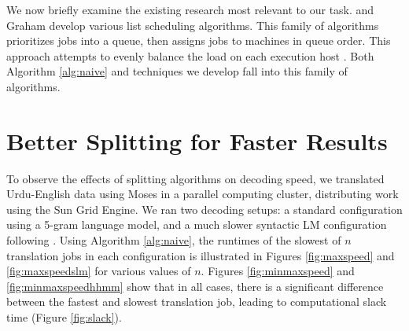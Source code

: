 \documentclass{pbml}
\begin{document}
We now briefly examine the existing research most relevant to our task. \citet{Hu61} and Graham \citeyearpar{Graham66,Graham69} develop various list scheduling algorithms. This family of algorithms prioritizes jobs into a queue, then assigns jobs to machines in queue order. This approach attempts to evenly balance the load on each execution host \citep{DeMorton80,ChengSin90}. 
Both Algorithm \ref{alg:naive} and techniques we develop fall into this family of algorithms.







\section{Better Splitting for Faster Results}


To observe the effects of splitting algorithms on decoding speed, we translated Urdu-English data using Moses in a parallel computing cluster, distributing work using the Sun Grid Engine. We ran two decoding setups: a standard configuration using a 5-gram language model, and a much slower syntactic LM configuration following \citet{schwartzetal11}. Using Algorithm \ref{alg:naive}, the runtimes of the slowest of $n$ translation jobs in each configuration is illustrated in Figures \ref{fig:maxspeed} and \ref{fig:maxspeedslm} for various values of $n$. Figures \ref{fig:minmaxspeed} and \ref{fig:minmaxspeedhhmm} show that in all cases, there is a significant difference between the fastest and slowest translation job, leading to computational slack time (Figure \ref{fig:slack}).

\end{document}
